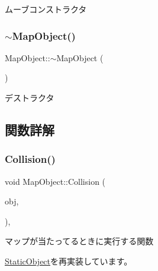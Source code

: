 ムーブコンストラクタ 

\mbox{\label{class_map_object_aa601344267a49df197e841fcbd732209}} 
\subsubsection{\texorpdfstring{$\sim$\+Map\+Object()}{~MapObject()}}
{\footnotesize\ttfamily Map\+Object\+::$\sim$\+Map\+Object (\begin{DoxyParamCaption}{ }\end{DoxyParamCaption})\hspace{0.3cm}{\ttfamily [inline]}}



デストラクタ 



\subsection{関数詳解}
\mbox{\label{class_map_object_a61c2b7e046b76d98adbf23c9e6302918}} 
\subsubsection{\texorpdfstring{Collision()}{Collision()}}
{\footnotesize\ttfamily void Map\+Object\+::\+Collision (\begin{DoxyParamCaption}\item[{\mbox{\hyperlink{class_object_base}{Object\+Base}} $\ast$}]{obj,  }\item[{\mbox{\hyperlink{common_8h_afb0c5e21d4133ff4f200992c0b534e1b}{V\+E\+C2}}}]{ }\end{DoxyParamCaption})\hspace{0.3cm}{\ttfamily [final]}, {\ttfamily [virtual]}}



マップが当たってるときに実行する関数 



\mbox{\hyperlink{class_static_object_abe05f711f0d62319e1a11419813c5d50}{Static\+Object}}を再実装しています。

\mbox{\label{class_map_object_ad4bcfdc33bd945a9aa5e50a57c2704bc}} 
